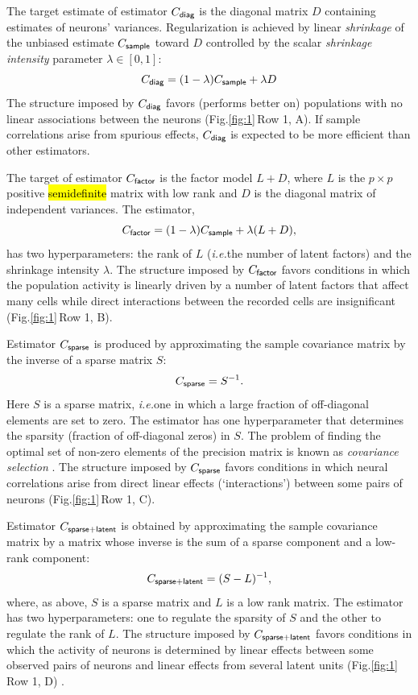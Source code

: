 \documentclass[10pt]{article}
\newcommand{\sq}[1]{\lq#1\rq}
\newcommand{\figref}[2]{Fig.\;\ref{fig:#1}\,#2}
\newcommand{\ie}{\emph{i.e.}\;}
\begin{document}
The target estimate of estimator $C_{\sf diag}$ is the diagonal matrix $D$ containing estimates of neurons' variances. Regularization is achieved by linear \emph{shrinkage} of the unbiased estimate $C_{\sf sample}$ toward $D$ controlled by the scalar \emph{shrinkage intensity} parameter $\lambda \in [0, 1]$:
\begin{equation}\label{eq:c-diag}
C_{\sf diag} = (1-\lambda) C_{\sf sample} + \lambda D
\end{equation}
The structure imposed by $C_{\sf diag}$ favors (performs better  on) populations   with no linear associations between the neurons (\figref{1}{Row 1, A}).  If sample correlations arise from spurious effects, $C_{\sf diag}$ is expected to be more efficient than other estimators. 

The target of estimator $C_{\sf factor}$ is the factor model $L + D$, where $L$ is the $p\times p$ positive \hl{semidefinite} matrix with low rank and $D$ is the diagonal matrix of independent variances.  The estimator, 
\begin{equation}\label{eq:c-factor}
C_{\sf factor} = (1-\lambda) C_{\sf sample} + \lambda (L + D),
\end{equation}
has two hyperparameters: the rank of $L$ (\ie the number of latent factors) and the shrinkage intensity $\lambda$. The structure imposed by $C_{\sf factor}$ favors conditions in which the population activity is linearly driven by a number of latent factors that affect many cells while direct interactions between the recorded cells are insignificant (\figref{1}{Row 1, B}).   

Estimator $C_{\sf sparse}$ is produced by approximating the sample covariance matrix by the inverse of a sparse matrix $S$: 
\begin{equation}\label{eq:c-sparse}
C_{\sf sparse} = S^{-1}.
\end{equation}
Here $S$ is a sparse matrix, \ie one in which a large fraction of off-diagonal elements are set to zero.  The estimator has one hyperparameter that determines the sparsity (fraction of off-diagonal zeros) in $S$. The problem of finding the optimal set of non-zero elements of the precision matrix is known as \emph{covariance selection} \cite{Dempster:1972}. The structure imposed by $C_{\sf sparse}$ favors conditions in which neural correlations arise from direct linear effects (\sq{interactions}) between some pairs of neurons (\figref{1}{Row 1, C}).  


Estimator $C_{\sf sparse+latent}$ is obtained by approximating the sample covariance matrix by a matrix whose inverse is the sum of a sparse component and a low-rank component: 
\begin{equation}\label{eq:c-sl}
C_{\sf sparse+latent} = (S - L)^{-1},
\end{equation}
where, as above, $S$ is a sparse matrix and $L$ is a low rank matrix. The estimator has two hyperparameters: one to regulate the sparsity of $S$ and the other to regulate the rank of $L$. The structure imposed by $C_{\sf sparse+latent}$ favors conditions in which the activity of neurons is determined by linear effects between some observed pairs of neurons and linear effects from several latent units (\figref{1}{Row 1, D}) \cite{Chandrasekaran:2010,Ma:2013}.
\end{document}
